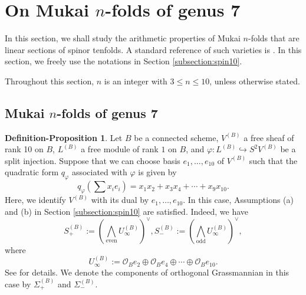 \documentclass[autodetect-engine, a4paper]{amsart}
\theoremstyle{definition}
\newtheorem{defn-prop}[thm]{Definition-Proposition}
\def\cO{\mathcal{O}}
\newcommand{\cred}{\color{black}}
\begin{document}
\section{On Mukai $n$-folds of genus 7}
\label{Section:Mukain}

In this section, we shall study the arithmetic properties of Mukai $n$-folds that are linear sections of spinor tenfolds. A standard reference of such varieties is \cite{Kuznetsovspinor}. 
In this section, we freely use the notations in
Section \ref{subsection:spin10}.

Throughout this section, $n$ is an integer with $3 \leq n \leq 10$, unless otherwise stated. 

\subsection{Mukai $n$-folds of genus 7}

\begin{defn-prop}
Let $B$ be a {\cred connected} scheme, $V^{(B)}$ a free sheaf of rank 10 on $B$, $L^{(B)}$ a free module of rank $1$ on $B$, and $\varphi \colon L^{(B)} \hookrightarrow S^2 V^{(B)}$ be a split injection.
Suppose that we can choose basis $e_{1}, \ldots, e_{10}$ of $V^{(B)}$ such that 
the quadratic form $q_{\varphi}$ associated with $\varphi$ is given by 
\[
q_{\varphi} (\sum x_i e_i) = x_1 x_2 + x_3 x_4 + \cdots + x_9 x_{10}.
\]
Here, we identify $V^{(B)}$ with its dual by $e_{1}, \ldots, e_{10}$.
In this case, Assumptions (a) and (b) in Section \ref{subsection:spin10} are satisfied. 
Indeed, we have
\[
S_{+}^{(B)} := (\bigwedge_{\mathrm{even}} U_{\infty}^{(B)})^{\vee}, S_{-}^{(B)} := (\bigwedge_{\mathrm{odd}} U_{\infty}^{(B)})^{\vee},
\]
where 
\[
U_{\infty}^{(B)} := \cO_{B} e_{2} \oplus \cO_{B} e_{4} \oplus \cdots \oplus \cO_{B} e_{10}.
\]
See \cite{Mukaicurve} for details.
We denote the components of orthogonal Grassmannian in this case by $\Sigma_{+}^{(B)}$ and $\Sigma_{-}^{(B)}$.
\end{defn-prop}
\end{document}
